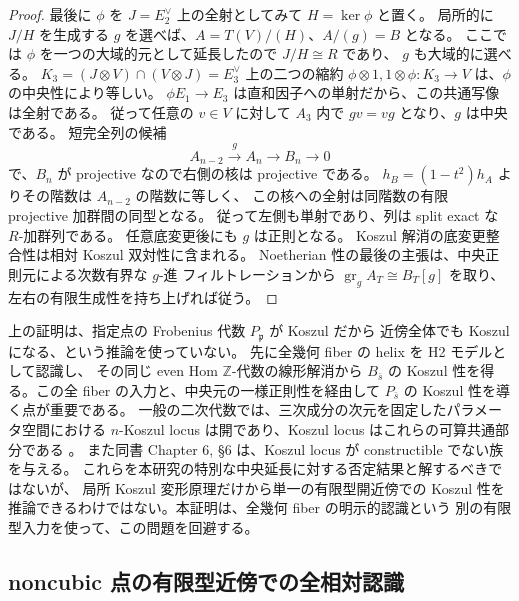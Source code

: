 \begin{proof}
最後に $\phi$ を $J=E_2^\vee$ 上の全射としてみて $H=\ker\phi$ と置く。
局所的に $J/H$ を生成する $g$ を選べば、$A=T(V)/(H)$、$A/(g)=B$ となる。
ここでは $\phi$ を一つの大域的元として延長したので $J/H\cong R$ であり、
$g$ も大域的に選べる。
$K_3=(J\otimes V)\cap(V\otimes J)=E_3^\vee$ 上の二つの縮約
$\phi\otimes1,1\otimes\phi:K_3\to V$ は、$\phi$ の中央性により等しい。
$\phi E_1\to E_3$ は直和因子への単射だから、この共通写像は全射である。
従って任意の $v\in V$ に対して $A_3$ 内で $gv=vg$ となり、$g$ は中央である。
短完全列の候補
\[
 A_{n-2}\xrightarrow{\,g\,}A_n\longrightarrow B_n\longrightarrow0
\]
で、$B_n$ が projective なので右側の核は projective である。
$h_B=(1-t^2)h_A$ よりその階数は $A_{n-2}$ の階数に等しく、
この核への全射は同階数の有限 projective 加群間の同型となる。
従って左側も単射であり、列は split exact な $R$-加群列である。
任意底変更後にも $g$ は正則となる。
Koszul 解消の底変更整合性は相対 Koszul 双対性に含まれる。
Noetherian 性の最後の主張は、中央正則元による次数有界な $g$-進
フィルトレーションから $\operatorname{gr}_gA_T\cong B_T[g]$ を取り、
左右の有限生成性を持ち上げれば従う。
\end{proof}

\begin{remark}
上の証明は、指定点の Frobenius 代数 $P_{\mathfrak p}$ が Koszul だから
近傍全体でも Koszul になる、という推論を使っていない。
先に全幾何 fiber の helix を H2 モデルとして認識し、
その同じ even Hom $\mathbb Z$-代数の線形解消から $B_{\bar s}$ の
Koszul 性を得る。この全 fiber の入力と、中央元の一様正則性を経由して
$P_{\bar s}$ の Koszul 性を導く点が重要である。
一般の二次代数では、三次成分の次元を固定したパラメータ空間における
$n$-Koszul locus は開であり、Koszul locus はこれらの可算共通部分である
\cite[Chapter 6, Theorem 2.1 and Corollary 2.2]{PolishchukPositselski2005}。
また同書 Chapter 6, \S6 は、Koszul locus が constructible でない族を与える。
これらを本研究の特別な中央延長に対する否定結果と解するべきではないが、
局所 Koszul 変形原理だけから単一の有限型開近傍での Koszul 性を
推論できるわけではない。本証明は、全幾何 fiber の明示的認識という
別の有限型入力を使って、この問題を回避する。
\end{remark}

\subsection{noncubic 点の有限型近傍での全相対認識}

